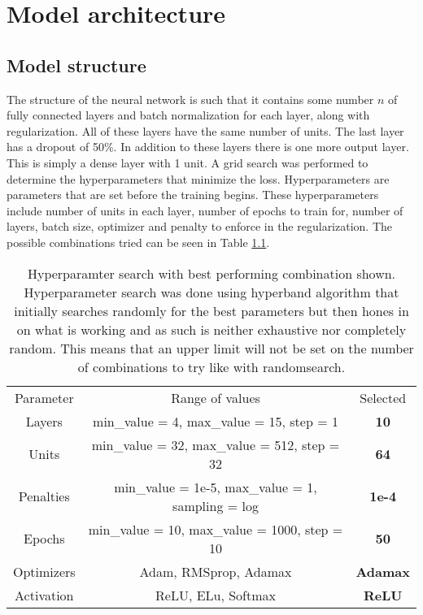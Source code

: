 
\chapter{Model architecture} %

\label{Chapter4} %


\section{Model structure}
The structure of the neural network is such that it contains some number $n$ of fully connected layers and batch normalization for each layer, along with regularization. All of these layers have the same number of units. The last layer has a dropout of 50\%. In addition to these layers there is one more output layer. This is simply a dense layer with 1 unit. A grid search was performed to determine the hyperparameters that minimize the loss. Hyperparameters are parameters that are set before the training begins\cite{hyperparameters_definition}. These hyperparameters include number of units in each layer, number of epochs to train for, number of layers, batch size, optimizer and penalty to enforce in the regularization. The possible combinations tried can be seen in Table \ref{table:gridSearchHyperparamters}.

\begin{table}[h]
    \centering
    \caption[Hyperparameter search with best performing combination.]{Hyperparamter search with best performing combination shown. Hyperparameter search was done using hyperband algorithm that initially searches randomly for the best parameters but then hones in on what is working and as such is neither exhaustive nor completely random. This means that an upper limit will not be set on the number of combinations to try like with randomsearch.}
    \label{table:gridSearchHyperparamters}
    \begin{tabular}{ccc}
        Parameter & Range of values & Selected\\
        Layers &  min\_value = 4, max\_value = 15, step = 1 & \textbf{10}\\
        Units &  min\_value = 32, max\_value = 512, step = 32 & \textbf{64}\\
        Penalties & min\_value = 1e-5, max\_value = 1, sampling = log & \textbf{1e-4}\\
        Epochs & min\_value = 10, max\_value = 1000, step = 10 & \textbf{50}\\
        Optimizers & Adam, RMSprop, Adamax & \textbf{Adamax}\\
        Activation & ReLU, ELu, Softmax & \textbf{ReLU}\\
    \end{tabular}
\end{table}